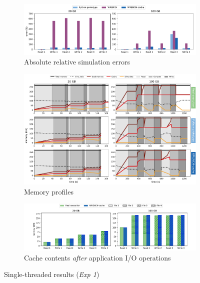 \begin{figure}
    \centering
    \begin{subfigure}{\linewidth}
        \centering
           \includegraphics[width=\linewidth]{result/single/figures/single_errors.pdf}
           \vspace*{-0.7cm}
           \caption{Absolute relative simulation errors}
           \vspace*{0.5cm}
           \label{fig:single_error}
        \end{subfigure}
    \begin{subfigure}{\linewidth}
        \centering
           \includegraphics[width=\linewidth]{result/single/figures/single_memprof.pdf}
           \vspace*{-0.7cm}
           \caption{Memory profiles}
           \vspace*{0.5cm}
           \label{fig:single_memprof}
    \end{subfigure}
    \begin{subfigure}{\linewidth}
        \centering
           \includegraphics[width=\linewidth]{result/single/figures/cached_files.pdf}
           \caption{Cache contents \emph{after} application I/O operations}
           \label{fig:single_cache}
    \end{subfigure}
    \caption{Single-threaded results (\textit{Exp 1})}
\end{figure}

